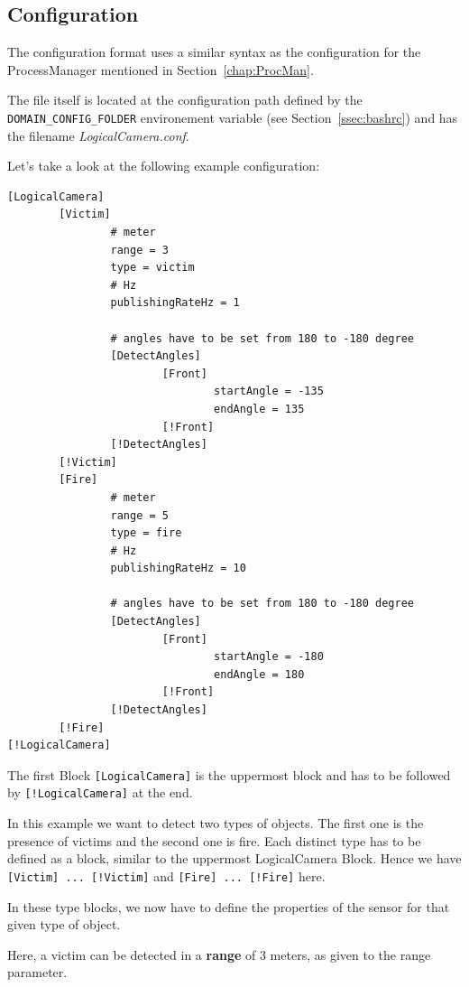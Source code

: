 \subsection{Configuration}

The configuration format uses a similar syntax as the configuration for the ProcessManager mentioned in Section~\ref{chap:ProcMan}.

The file itself is located at the configuration path defined by the \verb$DOMAIN_CONFIG_FOLDER$ environement variable (see Section~\ref{ssec:bashrc}) and has the filename \textit{LogicalCamera.conf}.

Let's take a look at the following example configuration:

\begin{verbatim}
[LogicalCamera]
        [Victim]
                # meter
                range = 3
                type = victim
                # Hz
                publishingRateHz = 1

                # angles have to be set from 180 to -180 degree
                [DetectAngles]
                        [Front]
                                startAngle = -135
                                endAngle = 135
                        [!Front]
                [!DetectAngles]
        [!Victim]
        [Fire]
                # meter
                range = 5
                type = fire
                # Hz
                publishingRateHz = 10

                # angles have to be set from 180 to -180 degree
                [DetectAngles]
                        [Front]
                                startAngle = -180
                                endAngle = 180
                        [!Front]
                [!DetectAngles]
        [!Fire]
[!LogicalCamera]
\end{verbatim}

The first Block \verb$[LogicalCamera]$ is the uppermost block and has to be followed by \verb$[!LogicalCamera]$ at the end.

In this example we want to detect two types of objects. The first one is the presence of victims and the second one is fire. Each distinct type has to be defined as a block, similar to the uppermost LogicalCamera Block. Hence we have \verb$[Victim] ... [!Victim]$ and \verb$[Fire] ... [!Fire]$ here.

In these type blocks, we now have to define the properties of the sensor for that given type of object.

Here, a victim can be detected in a \textbf{range} of 3 meters, as given to  the range parameter.

